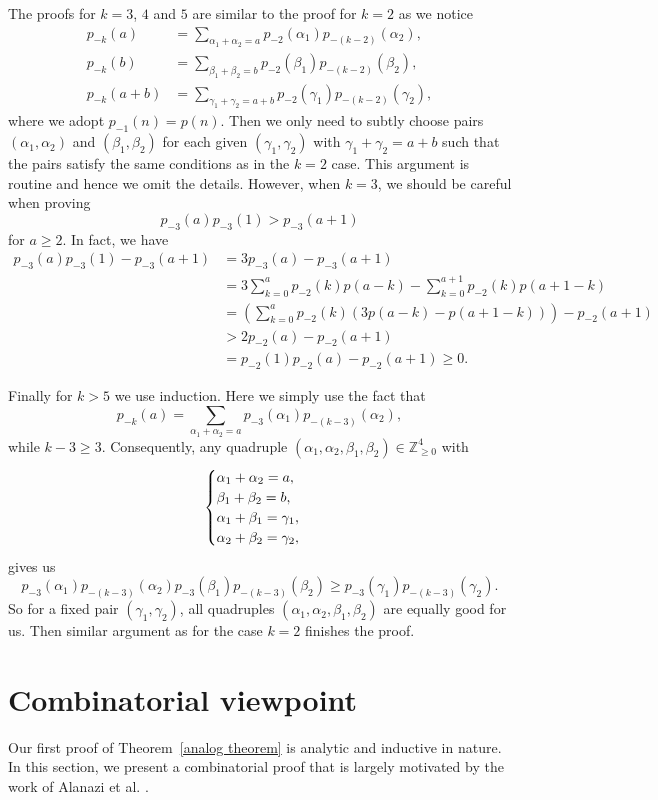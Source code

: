 \documentclass[12pt,reqno]{amsart}
\numberwithin{equation}{section}
\theoremstyle{plain}
\theoremstyle{definition}
\begin{document}
The proofs for $k=3$, $4$ and $5$ are similar to the proof for $k=2$ as we notice
\begin{align*}
p_{-k}(a)&=\sum_{\alpha_{1}+\alpha_{2}=a}p_{-2}(\alpha_{1}) p_{-(k-2)}(\alpha_{2}),\\
p_{-k}(b)&=\sum_{\beta_{1}+\beta_{2}=b}p_{-2}(\beta_{1})p_{-(k-2)}(\beta_{2}),\\
p_{-k}(a+b) &=\sum_{\gamma_{1}+\gamma_{2}=a+b}p_{-2}(\gamma_{1})p_{-(k-2)}(\gamma_{2}),
\end{align*}
where we adopt $p_{-1}(n)=p(n)$. Then we only need to subtly choose pairs $(\alpha_{1},\alpha_{2})$ and $(\beta_{1},\beta_{2})$ for each given $(\gamma_1,\gamma_2)$ with $\gamma_1+\gamma_2=a+b$ such that the pairs satisfy the same conditions as in the $k=2$ case. This argument is routine and hence we omit the details. However, when $k=3$, we should be careful when proving
$$p_{-3}(a)p_{-3}(1)>p_{-3}(a+1)$$
for $a\ge 2$. In fact, we have
\begin{align*}
p_{-3}(a)p_{-3}(1)-p_{-3}(a+1)&=3p_{-3}(a)-p_{-3}(a+1)\\
&=3\sum_{k=0}^a p_{-2}(k)p(a-k)-\sum_{k=0}^{a+1}p_{-2}(k)p(a+1-k)\\
&=\left(\sum_{k=0}^a p_{-2}(k)(3p(a-k)-p(a+1-k))\right)-p_{-2}(a+1)\\
&> 2p_{-2}(a)-p_{-2}(a+1)\\
&=p_{-2}(1)p_{-2}(a)-p_{-2}(a+1)\ge 0.
\end{align*}

Finally for $k>5$ we use induction. Here we simply use the fact that
$$p_{-k}(a)=\sum_{\alpha_{1}+\alpha_{2}=a}p_{-3}(\alpha_{1}) p_{-(k-3)}(\alpha_{2}),$$
while $k-3\ge 3$. Consequently, any quadruple $(\alpha_1,\alpha_2,\beta_1,\beta_2)\in\mathbb{Z}_{\ge 0}^4$ with
\begin{align*}
\begin{cases}
\alpha_{1}+\alpha_{2}=a, \cr \beta_{1}+\beta_{2}=b, \cr \alpha_{1}+\beta_{1}=\gamma_{1}, \cr \alpha_{2}+\beta_{2}=\gamma_{2},
\end{cases}
\end{align*}
gives us
$$p_{-3}(\alpha_{1})p_{-(k-3)}(\alpha_{2})p_{-3}(\beta_{1})p_{-(k-3)}(\beta_{2})\ge p_{-3}(\gamma_{1})p_{-(k-3)}(\gamma_{2}).$$ So for a fixed pair $(\gamma_1,\gamma_2)$, all quadruples $(\alpha_1,\alpha_2,\beta_1,\beta_2)$ are equally good for us. Then similar argument as for the case $k=2$ finishes the proof.


\section{Combinatorial viewpoint}\label{sect:comb proof}
Our first proof of Theorem~\ref{analog theorem} is analytic and inductive in nature. In this section, we present a combinatorial proof that is largely motivated by the work of Alanazi et al. \cite{AGM2016}.
\end{document}
